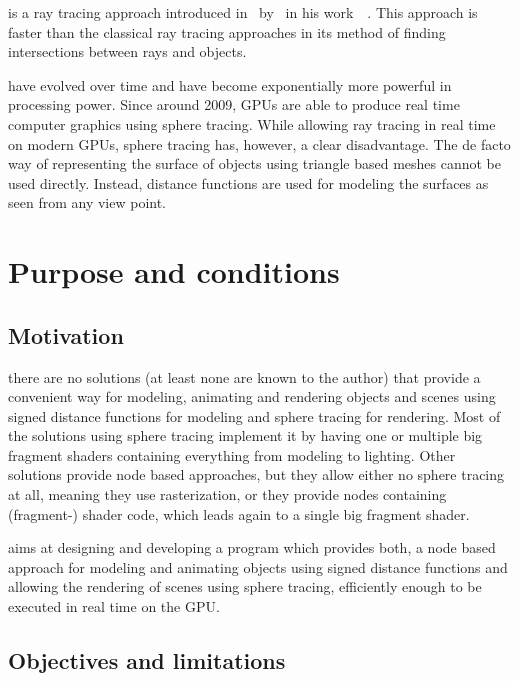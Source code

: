 \documentclass[%
    a4paper,    %
    justified,  %
    nobib,      %
    openany     %
]{tufte-book}
\makeatletter
\renewcommand{\label}[1]{\@tufte@label{##1}}%
\makeatother
\begin{document}
 is a ray tracing approach introduced
in~\citeyear{hart_sphere_1994} by~ in his
work~~\cite{hart_sphere_1994}. This approach is
faster than the classical ray tracing approaches in its method of finding
intersections between rays and objects.

 have evolved over time and have
become exponentially more powerful in processing power. Since around 2009, GPUs are able to
produce real time computer graphics using sphere tracing. While allowing ray
tracing in real time on modern GPUs, sphere tracing has, however, a clear
disadvantage. The de facto way of representing the surface of objects using triangle based
meshes cannot be used directly. Instead, distance functions are used for
modeling the surfaces as seen from any view point.

\section{Purpose and conditions}
\label{sec:purpose}

\subsection{Motivation}
\label{subsec:motivation}

 there are no solutions (at least none are
known to the author) that provide a convenient way for modeling, animating and
rendering objects and scenes using signed distance functions for modeling and
sphere tracing for rendering.
Most of the solutions using sphere tracing implement it by having one or
multiple big fragment shaders containing everything from modeling to lighting.
Other solutions provide node based approaches, but they allow either no sphere
tracing at all, meaning they use rasterization, or they provide nodes containing
(fragment-) shader code, which leads again to a single big fragment shader.

 aims at designing and developing a program which
provides both, a node based approach for modeling and animating objects using
signed distance functions and allowing the rendering of scenes using sphere
tracing, efficiently enough to be executed in real time on the GPU.

\subsection{Objectives and limitations}
\label{subsec:objectives}
\end{document}

